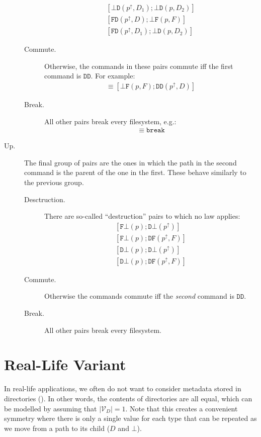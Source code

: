 \documentclass[12pt]{article}
\newcommand{\setvx}[1]{\mathcal{V}_{#1}}
\newcommand{\setd}{\setvx{D}}
\newcommand{\empt}{\bot}
\newcommand{\pp}{p^\uparrow} %
\newcommand{\cbrk}{\mathtt{break}}
\newcommand{\fscommand}[2]{{#1#2}}
\newcommand{\fsregcommandchar}[1]{\mathtt{#1}}
\newcommand{\fsregcommand}[2]{\fscommand{\fsregcommandchar{#1}}{\fsregcommandchar{#2}}}
\newcommand{\cbf}{\fsregcommand{\empt}{F}}
\newcommand{\cbd}{\fsregcommand{\empt}{D}}
\newcommand{\cfb}{\fsregcommand{F}{\empt}}
\newcommand{\cfd}{\fsregcommand{F}{D}}
\newcommand{\cdb}{\fsregcommand{D}{\empt}}
\newcommand{\cdf}{\fsregcommand{D}{F}}
\newcommand{\cdd}{\fsregcommand{D}{D}}
\theoremstyle{definition}
\begin{document}
\begin{description}
\begin{description}
\begin{gather*}
            [\cbd(\pp, D_1); \cbd(p, D_2)] \\
            [\cfd(\pp, D); \cbf(p, F)] \\
            [\cfd(\pp, D_1); \cbd(p, D_2)]
   \end{gather*}
   \item[Commute.] Otherwise, the commands in these pairs commute iff the first command is $\cdd$. For example:
   \begin{gather*}
   [\cdd(\pp, D); \cbf(p, F)] \equiv [\cbf(p, F); \cdd(\pp, D)]
   \end{gather*}
   \item[Break.] All other pairs break every filesystem, e.g.:
   \begin{gather*}
   [\cdf(\pp, F); \cbd(p, D)] \equiv \cbrk
   \end{gather*}
   \end{description}
%
\item[Up.]
The final group of pairs are the ones in which the path in the second
command is the parent of the one in the first.
These behave similarly to the previous group. 
   \begin{description}
   \item[Desctruction.] There are
   so-called ``destruction'' pairs to which no law applies:
   \begin{gather*}
            [\cfb(p); \cdb(\pp)] \\
            [\cfb(p); \cdf(\pp, F)] \\
            [\cdb(p); \cdb(\pp)] \\
            [\cdb(p); \cdf(\pp, F)]
   \end{gather*}
   \item[Commute.] Otherwise the commands commute iff the \emph{second} command is $\cdd$.
   \item[Break.] All other pairs break every filesystem.
   \end{description}
\end{description}

\section{Real-Life Variant}

In real-life applications, we often do not want to consider metadata stored in
directories (\cite{BZ}). In other words, the contents of directories are all equal,
which can be modelled by assuming that $|\setd|=1$.
Note that this creates a convenient symmetry where there is only a single value
for each type that can be repeated as we move from a path to its child ($D$ and $\empt$).
\end{document}
